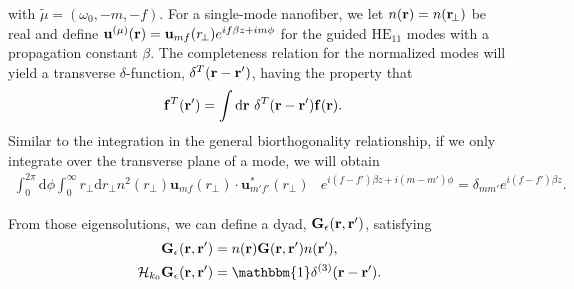 with $ \tilde{\mu}=(\omega_0,-m,-f) $. For a single-mode nanofiber, we let $ n(\mathbf{r})=n(\mathbf{r}\!_\perp) $ be real and define $ \mathbf{u}^{(\mu)}(\mathbf{r})=\mathbf{u}_{mf}(r\!_\perp )e^{if\beta z+im\phi} $ for the guided $\mathrm{HE}_{11}$ modes with a propagation constant $ \beta  $. The completeness relation for the normalized modes will yield a transverse $ \delta $-function, $ \delta^T(\mathbf{r}-\mathbf{r}') $, having the property that
\begin{align}
\mathbf{f}^T(\mathbf{r}')&=\int \mathrm{d}\mathbf{r}\,\, \delta^T(\mathbf{r}-\mathbf{r}')\mathbf{f}(\mathbf{r}).
\end{align} 
Similar to the integration in the general biorthogonality relationship, if we only integrate over the transverse plane of a mode, we will obtain
\begin{align}
\int_0^{2\pi}\!\!\!\!\! \mathrm{d}\phi\!\! \int_0^\infty\!\!\!\! r\!_\perp \mathrm{d}r\!_\perp  n^2(r\!_\perp) \mathbf{u}_{mf}(r\!_\perp )\!\cdot\!\mathbf{u}_{m'f'}^*(r\!_\perp )& e^{i(f\!-\!f')\beta z+i(m\! -\! m')\phi}  =\delta_{mm'}e^{i(f\!-\!f')\beta z} \label{eq:orthutrans2D}.
\end{align}


From those eigensolutions, we can define a dyad, $ \mathbf{G}_\epsilon(\mathbf{r},\mathbf{r}') $, satisfying
\begin{align}
\mathbf{G}_\epsilon(\br,\br') &= n(\br) \mathbf{G}(\br,\br') n(\br'),\\
\mathcal{H}_{k_0} \mathbf{G}_\epsilon(\br,\br') &= \mathbbm{1}\delta^{(3)}(\br-\br').\label{eq:HGtilde}
\end{align}

